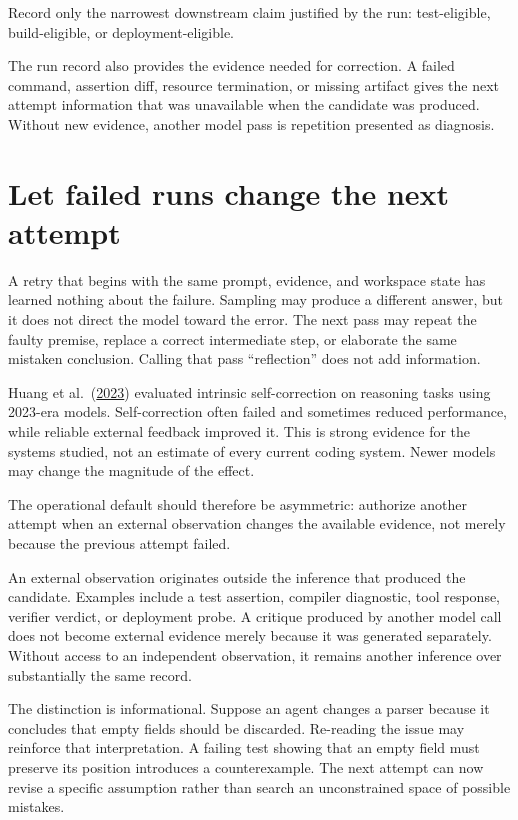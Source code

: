 Record only the narrowest downstream claim justified by the run: test-eligible, build-eligible, or deployment-eligible.

The run record also provides the evidence needed for correction. A failed command, assertion diff, resource termination, or missing artifact gives the next attempt information that was unavailable when the candidate was produced. Without new evidence, another model pass is repetition presented as diagnosis.

\hypertarget{let-failed-runs-change-the-next-attempt}{%
\section{Let failed runs change the next attempt}\label{let-failed-runs-change-the-next-attempt}}

A retry that begins with the same prompt, evidence, and workspace state has learned nothing about the failure. Sampling may produce a different answer, but it does not direct the model toward the error. The next pass may repeat the faulty premise, replace a correct intermediate step, or elaborate the same mistaken conclusion. Calling that pass ``reflection'' does not add information.

Huang et al.~(\href{https://arxiv.org/abs/2310.01798}{2023}) evaluated intrinsic self-correction on reasoning tasks using 2023-era models. Self-correction often failed and sometimes reduced performance, while reliable external feedback improved it. This is strong evidence for the systems studied, not an estimate of every current coding system. Newer models may change the magnitude of the effect.

The operational default should therefore be asymmetric: authorize another attempt when an external observation changes the available evidence, not merely because the previous attempt failed.

An external observation originates outside the inference that produced the candidate. Examples include a test assertion, compiler diagnostic, tool response, verifier verdict, or deployment probe. A critique produced by another model call does not become external evidence merely because it was generated separately. Without access to an independent observation, it remains another inference over substantially the same record.

The distinction is informational. Suppose an agent changes a parser because it concludes that empty fields should be discarded. Re-reading the issue may reinforce that interpretation. A failing test showing that an empty field must preserve its position introduces a counterexample. The next attempt can now revise a specific assumption rather than search an unconstrained space of possible mistakes.

